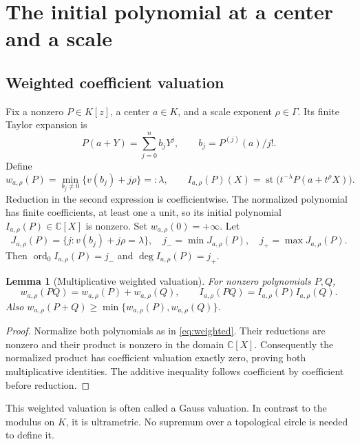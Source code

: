 \documentclass[11pt,letterpaper]{article}
\numberwithin{equation}{section}
\newtheorem{lemma}[theorem]{Lemma}
\theoremstyle{definition}
\theoremstyle{remark}\newtheorem{remark}[theorem]{Remark}
\newcommand{\C}{\mathbb C}
\newcommand{\st}{\operatorname{st}}
\newcommand{\ord}{\operatorname{ord}}
\begin{document}
\section{The initial polynomial at a center and a scale}\label{sec:initial}

\subsection{Weighted coefficient valuation}
Fix a nonzero $P\in K[z]$, a center $a\in K$, and a scale exponent
$\rho\in\Gamma$. Its finite Taylor expansion is
\[
 P(a+Y)=\sum_{j=0}^n b_jY^j,\qquad b_j=P^{(j)}(a)/j!.
\]
Define
\begin{equation}\label{eq:weighted}
 w_{a,\rho}(P)=\min_{b_j\ne0}\{v(b_j)+j\rho\}=:\lambda,
 \qquad
 I_{a,\rho}(P)(X)=\st\bigl(t^{-\lambda}P(a+t^\rho X)\bigr).
\end{equation}
Reduction in the second expression is coefficientwise. The normalized
polynomial has finite coefficients, at least one a unit, so its initial
polynomial $I_{a,\rho}(P)\in\C[X]$ is nonzero. Set $w_{a,\rho}(0)=+\infty$.
Let
\begin{equation}\label{eq:active}
 J_{a,\rho}(P)=\{j:v(b_j)+j\rho=\lambda\},\quad
 j_- =\min J_{a,\rho}(P),\quad j_+=\max J_{a,\rho}(P).
\end{equation}
Then $\ord_0 I_{a,\rho}(P)=j_-$ and $\deg I_{a,\rho}(P)=j_+$.

\begin{lemma}[Multiplicative weighted valuation]\label{lem:gaussvaluation}
For nonzero polynomials $P,Q$,
\[
 w_{a,\rho}(PQ)=w_{a,\rho}(P)+w_{a,\rho}(Q),\qquad
 I_{a,\rho}(PQ)=I_{a,\rho}(P)I_{a,\rho}(Q).
\]
Also $w_{a,\rho}(P+Q)\ge\min\{w_{a,\rho}(P),w_{a,\rho}(Q)\}$.
\end{lemma}
\begin{proof}
Normalize both polynomials as in \eqref{eq:weighted}. Their reductions
are nonzero and their product is nonzero in the domain $\C[X]$.
Consequently the normalized product has coefficient valuation exactly
zero, proving both multiplicative identities. The additive inequality
follows coefficient by coefficient before reduction.
\end{proof}
This weighted valuation is often called a Gauss valuation. In contrast
to the modulus on $K$, it is ultrametric. No supremum over a topological
circle is needed to define it.
\end{document}
